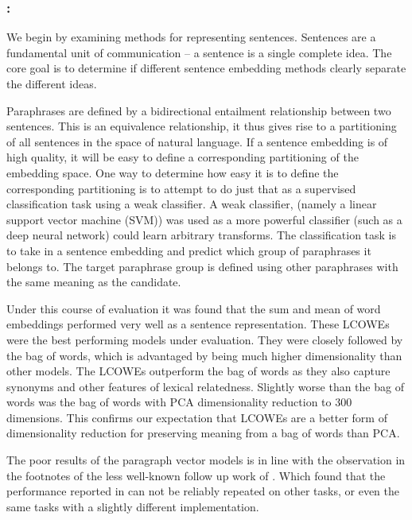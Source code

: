 \documentclass{book}
\begin{document}
\newcommand{\detailcite}[1]{\citep{#1} \\ \citetitle{#1} }

\subsubsection{: \detailcite{White2015SentVecMeaning}}
We begin by examining methods for representing sentences.
Sentences are a fundamental unit of communication --
a sentence is a single complete idea.
The core goal is to determine if different sentence embedding methods clearly separate the different ideas.


Paraphrases are defined by a bidirectional entailment relationship between two sentences.
This is an equivalence relationship, it thus gives rise to a partitioning of all sentences in the space of natural language.
If a sentence embedding is of high quality, it will be easy to define a corresponding partitioning of the embedding space.
One way to determine how easy it is to define the corresponding partitioning is to attempt to do just that as a supervised classification task using a weak classifier.
A weak classifier, (namely a linear support vector machine (SVM)) was used as a more powerful classifier (such as a deep neural network) could learn arbitrary transforms.
The classification task is to take in a sentence embedding and predict which group of paraphrases it belongs to.
The target paraphrase group is defined using other paraphrases with the same meaning as the candidate.

Under this course of evaluation it was found that the sum and mean of word embeddings performed very well as a sentence representation.
These LCOWEs were the best performing models under evaluation.
They were closely followed by the bag of words, which is advantaged by being much higher dimensionality than other models.
The LCOWEs outperform the bag of words as they also capture  synonyms and other features of lexical relatedness.
Slightly worse than the bag of words was the bag of words with PCA dimensionality reduction to 300 dimensions.
This confirms our expectation that LCOWEs are a better form of dimensionality reduction for preserving meaning from a bag of words than PCA.


The poor results of the paragraph vector models \citep{le2014distributed} is in line with the observation in the footnotes of the less well-known follow up work of \citet{mesnil2014ensemble}.
Which found that the performance reported in \citet{le2014distributed} can not be reliably repeated on other tasks, or even the same tasks with a slightly different implementation.
 
\end{document}
